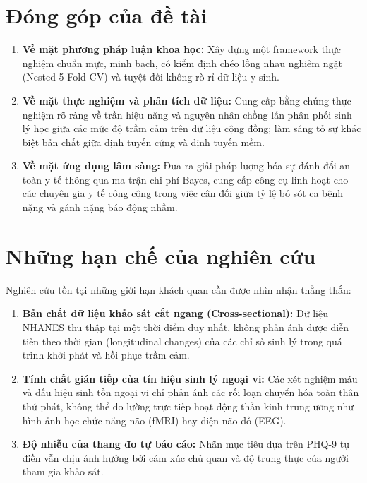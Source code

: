\section{Đóng góp của đề tài}
\label{sec:dong-gop-de-tai}

\begin{enumerate}
    \item \textbf{Về mặt phương pháp luận khoa học:} Xây dựng một framework thực nghiệm chuẩn mực, minh bạch, có kiểm định chéo lồng nhau nghiêm ngặt (Nested 5-Fold CV) và tuyệt đối không rò rỉ dữ liệu y sinh.
    \item \textbf{Về mặt thực nghiệm và phân tích dữ liệu:} Cung cấp bằng chứng thực nghiệm rõ ràng về trần hiệu năng và nguyên nhân chồng lấn phân phối sinh lý học giữa các mức độ trầm cảm trên dữ liệu cộng đồng; làm sáng tỏ sự khác biệt bản chất giữa định tuyến cứng và định tuyến mềm.
    \item \textbf{Về mặt ứng dụng lâm sàng:} Đưa ra giải pháp lượng hóa sự đánh đổi an toàn y tế thông qua ma trận chi phí Bayes, cung cấp công cụ linh hoạt cho các chuyên gia y tế công cộng trong việc cân đối giữa tỷ lệ bỏ sót ca bệnh nặng và gánh nặng báo động nhầm.
\end{enumerate}

\section{Những hạn chế của nghiên cứu}
\label{sec:han-che-nghien-cuu}

Nghiên cứu tồn tại những giới hạn khách quan cần được nhìn nhận thẳng thắn:
\begin{enumerate}
    \item \textbf{Bản chất dữ liệu khảo sát cắt ngang (Cross-sectional):} Dữ liệu NHANES thu thập tại một thời điểm duy nhất, không phản ánh được diễn tiến theo thời gian (longitudinal changes) của các chỉ số sinh lý trong quá trình khởi phát và hồi phục trầm cảm.
    \item \textbf{Tính chất gián tiếp của tín hiệu sinh lý ngoại vi:} Các xét nghiệm máu và dấu hiệu sinh tồn ngoại vi chỉ phản ánh các rối loạn chuyển hóa toàn thân thứ phát, không thể đo lường trực tiếp hoạt động thần kinh trung ương như hình ảnh học chức năng não (fMRI) hay điện não đồ (EEG).
    \item \textbf{Độ nhiễu của thang đo tự báo cáo:} Nhãn mục tiêu dựa trên PHQ-9 tự điền vẫn chịu ảnh hưởng bởi cảm xúc chủ quan và độ trung thực của người tham gia khảo sát.
\end{enumerate}

